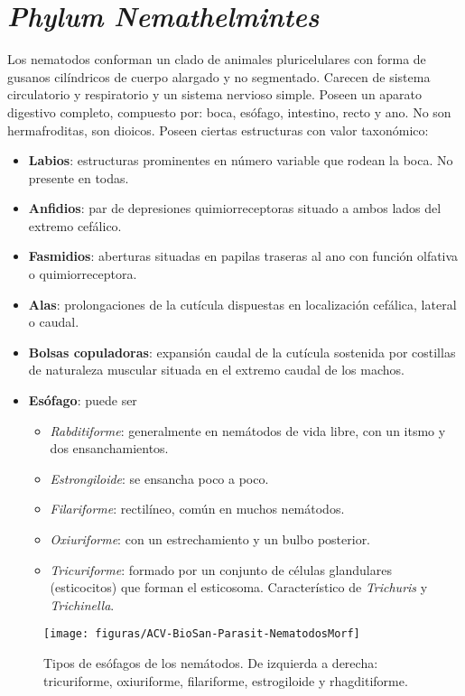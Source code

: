 \chapter{\textit{Phylum Nemathelmintes}}
Los nematodos conforman un clado de animales pluricelulares con forma de gusanos cilíndricos de cuerpo alargado y no segmentado. Carecen de sistema circulatorio y respiratorio y un sistema nervioso simple. Poseen un aparato digestivo completo, compuesto por: boca, esófago, intestino, recto y ano. No son hermafroditas, son dioicos. Poseen ciertas estructuras con valor taxonómico:
\begin{itemize}[itemsep=0pt,parsep=0pt,topsep=0pt,partopsep=0pt]
	\item \textbf{Labios}: estructuras prominentes en número variable que rodean la boca. No presente en todas.
	\item \textbf{Anfidios}: par de depresiones quimiorreceptoras situado a ambos lados del extremo cefálico.
	\item \textbf{Fasmidios}: aberturas situadas en papilas traseras al ano con función olfativa o quimiorreceptora.
	\item \textbf{Alas}: prolongaciones de la cutícula dispuestas en localización cefálica, lateral o caudal.
	\item \textbf{Bolsas copuladoras}: expansión caudal de la cutícula sostenida por costillas de naturaleza muscular situada en el extremo caudal de los machos.
	\item \textbf{Esófago}: puede ser
	\begin{itemize}[itemsep=0pt,parsep=0pt,topsep=0pt,partopsep=0pt]
		\item \textit{Rabditiforme}: generalmente en nemátodos de vida libre, con un itsmo y dos ensanchamientos.
		\item \textit{Estrongiloide}: se ensancha poco a poco.
		\item \textit{Filariforme}: rectilíneo, común en muchos nemátodos.
		\item \textit{Oxiuriforme}: con un estrechamiento y un bulbo posterior.
		\item \textit{Tricuriforme}: formado por un conjunto de células glandulares (esticocitos) que forman el esticosoma. Característico de \textit{Trichuris} y \textit{Trichinella}.
	\end{itemize}
\end{itemize}
\begin{figure}[H]
	\centering
	\texttt{[image: figuras/ACV-BioSan-Parasit-NematodosMorf]}
	\caption[Morfología de los esófagos de los nemátodos]{Tipos de esófagos de los nemátodos. De izquierda a derecha: tricuriforme, oxiuriforme, filariforme, estrogiloide y rhagditiforme.\label{fig:PARASIT:EsofagosMorf}}
\end{figure}
